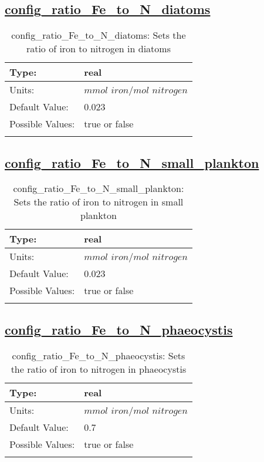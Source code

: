 \subsection[config\_ratio\_Fe\_to\_N\_diatoms]{\hyperref[sec:nm_tab_biogeochemistry]{config\_ratio\_Fe\_to\_N\_diatoms}}
\label{subsec:nm_sec_config_ratio_Fe_to_N_diatoms}
\begin{center}
\begin{longtable}{| p{2.0in} || p{4.0in} |}
    \hline
    Type: & real \\
    \hline
    Units: & $mmol$ $iron/mol$ $nitrogen$ \\
    \hline
    Default Value: & 0.023 \\
    \hline
    Possible Values: & true or false \\
    \hline
    \caption{config\_ratio\_Fe\_to\_N\_diatoms: Sets the ratio of iron to nitrogen in diatoms}
\end{longtable}
\end{center}
\subsection[config\_ratio\_Fe\_to\_N\_small\_plankton]{\hyperref[sec:nm_tab_biogeochemistry]{config\_ratio\_Fe\_to\_N\_small\_plankton}}
\label{subsec:nm_sec_config_ratio_Fe_to_N_small_plankton}
\begin{center}
\begin{longtable}{| p{2.0in} || p{4.0in} |}
    \hline
    Type: & real \\
    \hline
    Units: & $mmol$ $iron/mol$ $nitrogen$ \\
    \hline
    Default Value: & 0.023 \\
    \hline
    Possible Values: & true or false \\
    \hline
    \caption{config\_ratio\_Fe\_to\_N\_small\_plankton: Sets the ratio of iron to nitrogen in small plankton}
\end{longtable}
\end{center}
\subsection[config\_ratio\_Fe\_to\_N\_phaeocystis]{\hyperref[sec:nm_tab_biogeochemistry]{config\_ratio\_Fe\_to\_N\_phaeocystis}}
\label{subsec:nm_sec_config_ratio_Fe_to_N_phaeocystis}
\begin{center}
\begin{longtable}{| p{2.0in} || p{4.0in} |}
    \hline
    Type: & real \\
    \hline
    Units: & $mmol$ $iron/mol$ $nitrogen$ \\
    \hline
    Default Value: & 0.7 \\
    \hline
    Possible Values: & true or false \\
    \hline
    \caption{config\_ratio\_Fe\_to\_N\_phaeocystis: Sets the ratio of iron to nitrogen in phaeocystis}
\end{longtable}
\end{center}
